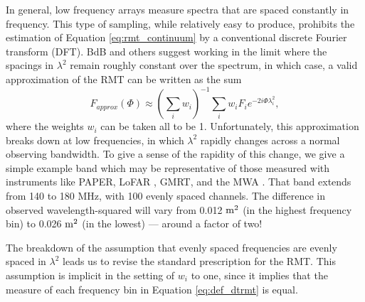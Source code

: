 In general, low frequency arrays measure spectra that are spaced constantly in frequency. This
type of sampling, while relatively easy to produce, prohibits the estimation of Equation
\ref{eq:rmt_continuum} by a conventional discrete Fourier transform
(DFT). BdB and others \cite[][e.g.]{Beck2012} suggest working in the limit where the spacings in
$\lambda^2$ remain roughly constant over the spectrum, in which case, a valid approximation of the
RMT can be written as the sum 
\begin{equation}
  F_{approx}(\Phi) \approx 
  \left(\sum_i w_i\right)^{-1}
  \sum_i w_iF_ie^{-2i\Phi\lambda^2_i},
  \label{eq:def_dtrmt}
\end{equation}
where the weights $w_i$ can be taken all to be 1. Unfortunately, this approximation breaks down at
low frequencies, in which $\lambda^2$ rapidly changes across a normal observing bandwidth. To give a
sense of the rapidity of this change, we give a simple example band which may be representative of
those measured with instruments like PAPER, LoFAR \cite{LOFAR}, GMRT, and the MWA \cite{MWA}. That
band extends from 140 to 180 MHz, with 100 evenly spaced channels. The difference in observed
wavelength-squared will vary from 0.012 ${\rm m}^2$ (in the highest frequency bin) to 0.026 ${\rm
m}^2$ (in the lowest) --- around a factor of two!

The breakdown of the assumption that evenly spaced frequencies are evenly spaced in $\lambda^2$ leads
us to revise the standard prescription for the RMT. This assumption is implicit in the setting of
$w_i$ to one, since it implies that the measure of each frequency bin in Equation \ref{eq:def_dtrmt}
is equal.
